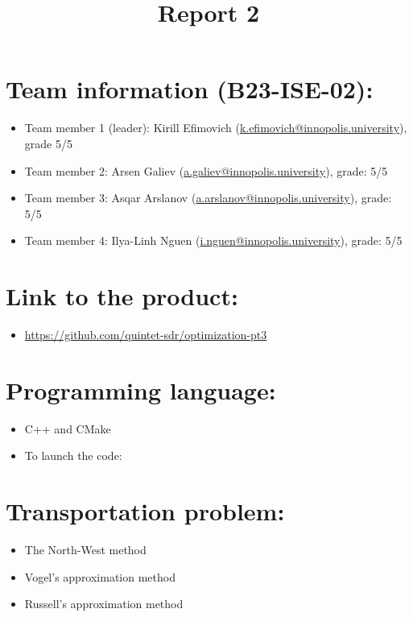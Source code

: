 \documentclass{article}
\title{\textbf{Report 2}}
\author{}
\date{}
\begin{document}
\maketitle

\thispagestyle{fancy}

\section*{Team information (B23-ISE-02):}
\begin{itemize}
\item Team member 1 (leader): Kirill Efimovich (\href{mailto:k.efimovich@innopolis.university}{k.efimovich@innopolis.university}), grade 5/5
\item Team member 2: Arsen Galiev (\href{mailto:a.galiev@innopolis.university}{a.galiev@innopolis.university}), grade: 5/5
\item Team member 3: Asqar Arslanov (\href{mailto:a.arslanov@innopolis.university}{a.arslanov@innopolis.university}), grade: 5/5
\item Team member 4: Ilya-Linh Nguen (\href{mailto:i.nguen@innopolis.university}{i.nguen@innopolis.university}), grade: 5/5
\end{itemize}

\section*{Link to the product:}

\begin{itemize}
\item \url{https://github.com/quintet-sdr/optimization-pt3}
\end{itemize}

\section*{Programming language:}

\begin{itemize}
\item C++ and CMake
\item To launch the code: 
\end{itemize}

\section*{Transportation problem:}

\begin{itemize}
\item The North-West method
\item Vogel’s approximation method
\item  Russell’s approximation method
\end{itemize}
\end{document}
